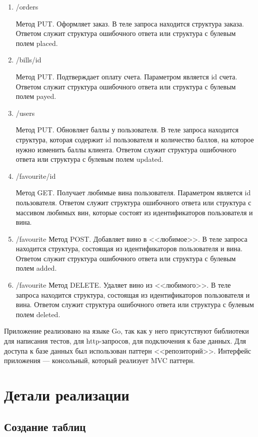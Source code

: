 \begin{enumerate}[label=\arabic*)]
\item /orders

Метод PUT. Оформляет заказ. В теле запроса находится структура заказа. Ответом служит структура ошибочного ответа или структура с булевым полем placed.

\item  /bills/{id}

Метод PUT. Подтверждает оплату счета. Параметром является id счета. Ответом служит структура ошибочного ответа или структура с булевым полем payed.

\item /users

Метод PUT. Обновляет баллы у пользователя. В теле запроса находится структура, которая содержит id пользователя и количество баллов, на которое нужно изменить баллы клиента. Ответом служит структура ошибочного ответа или структура с булевым полем updated.


\item /favourite/{id}

Метод GET. Получает любимые вина пользователя. Параметром является id пользователя. Ответом служит структура ошибочного ответа или структура с массивом любимых вин, которые состоят из идентификаторов пользователя и вина.

\item /favourite
Метод POST. Добавляет вино в <<любимое>>. В теле запроса находится структура, состоящая из идентификаторов пользователя и вина.
Ответом служит структура ошибочного ответа или структура с булевым полем added.

\item /favourite
Метод DELETE. Удаляет вино из <<любимого>>. В теле запроса находится структура, состоящая из идентификаторов пользователя и вина.
Ответом служит структура ошибочного ответа или структура с булевым полем deleted.

\end{enumerate}


Приложение реализовано на языке Go\cite{go}, так как у него присутствуют библиотеки для написания тестов, для http-запросов\cite{http}, для подключения к базе данных\cite{gorm}.  Для доступа к базе данных был использован паттерн <<репозиторий>>. Интерфейс приложения --- консольный, который реализует MVC паттерн.

\section{Детали реализации}
 \subsection{Создание таблиц}

